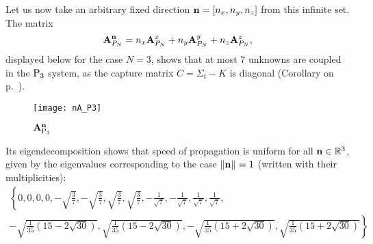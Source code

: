 Let us now take an arbitrary fixed direction $\bn = [n_x,n_y,n_z]$ from this infinite set. 
The matrix
$$
	\mat{A}_{P_N}^{\bn} = n_x \mat{A}_{P_N}^x + n_y \mat{A}_{P_N}^y + n_z \mat{A}_{P_N}^z,
$$
displayed below for the case $N = 3$, shows that at most 7 unknowns are coupled in the $\PN[3]$ system, as the
capture matrix $C = \Sigma_t - K$ is diagonal (Corollary \label{cor:capture} on p.~\pageref{cor:capture}).

\begin{figure}[htb]
\hspace*{-1.1cm}
  \texttt{[image: nA\_P3]}
  \caption{$\mat{A}_{\PN[3]}^{\bn}$}
  \label{fig:nAP3}
\end{figure}

Its eigendecomposition
shows that speed of propagation is uniform for all $\bn\in\R[3]$, given by the eigenvalues corresponding to the case
$\norm{\bn} = 1$ (written with their multiplicities):
$$
\begin{multlined}
\textstyle
\left\{0,0,0,0,-\sqrt{\frac{3}{7}},-\sqrt{\frac{3}{7}},\sqrt{\frac{3}{7}},\sqrt{\frac{3}{7}},-\frac{1}{\sqrt{7}},
-\frac{1}{\sqrt{7}},\frac{1}{\sqrt{7}},\frac{1}{\sqrt{7}},\right.\\
\textstyle
\left.-\sqrt{\frac{1}{35} \left(15-2 \sqrt{30}\right)},
\sqrt{\frac{1}{35} \left(15-2 \sqrt{30}\right)},-\sqrt{\frac{1}{35} \left(15+2 \sqrt{30}\right)},\sqrt{\frac{1}{35} 
\left(15+2 \sqrt{30}\right)}\right\}
\end{multlined} 
$$


